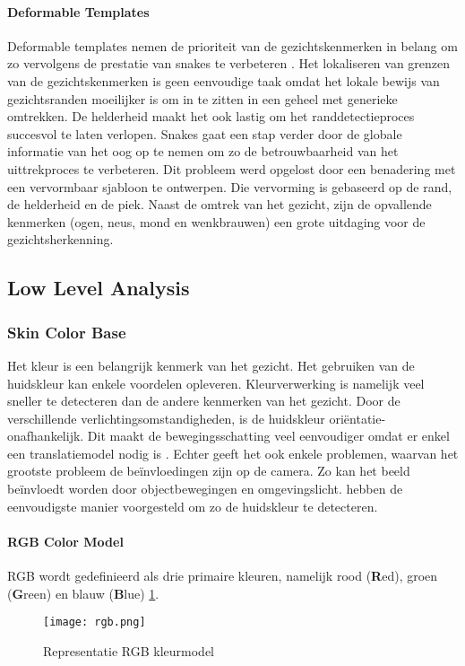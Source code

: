 \paragraph{Deformable Templates}
Deformable templates nemen de prioriteit van de gezichtskenmerken in belang om zo vervolgens de prestatie van snakes te verbeteren \autocite{Yuille1992}. Het lokaliseren van grenzen van de gezichtskenmerken is geen eenvoudige taak omdat het lokale bewijs van gezichtsranden moeilijker is om in te zitten in een geheel met generieke omtrekken. De helderheid maakt het ook lastig om het randdetectieproces succesvol te laten verlopen. Snakes gaat een stap verder door de globale informatie van het oog op te nemen om zo de betrouwbaarheid van het uittrekproces te verbeteren. Dit probleem werd opgelost door een benadering met een vervormbaar sjabloon te ontwerpen. Die vervorming is gebaseerd op de rand, de helderheid en de piek. Naast de omtrek van het gezicht, zijn de opvallende kenmerken (ogen, neus, mond en wenkbrauwen) een grote uitdaging voor de gezichtsherkenning.

\subsection{Low Level Analysis}
\subsubsection{Skin Color Base}
Het kleur is een belangrijk kenmerk van het gezicht. Het gebruiken van de huidskleur kan enkele voordelen opleveren. Kleurverwerking is namelijk veel sneller te detecteren dan de andere kenmerken van het gezicht. Door de verschillende verlichtingsomstandigheden, is de huidskleur oriëntatie-onafhankelijk. Dit maakt de bewegingsschatting veel eenvoudiger omdat er enkel een translatiemodel nodig is \autocite{Singh2003}. Echter geeft het ook enkele problemen, waarvan het grootste probleem de beïnvloedingen zijn op de camera. Zo kan het beeld beïnvloedt worden door objectbewegingen en omgevingslicht. \textcite{crowley1996} hebben de eenvoudigste manier voorgesteld om zo de huidskleur te detecteren.

\paragraph{RGB Color Model}
RGB wordt gedefinieerd als drie primaire kleuren, namelijk rood (\textbf{R}ed), groen (\textbf{G}reen) en blauw (\textbf{B}lue) \ref{fig:rgb}. 
\begin{figure}[htbp]
    \centering
    \texttt{[image: rgb.png]}
    \caption{Representatie RGB kleurmodel}
    \label{fig:rgb}
\end{figure}

